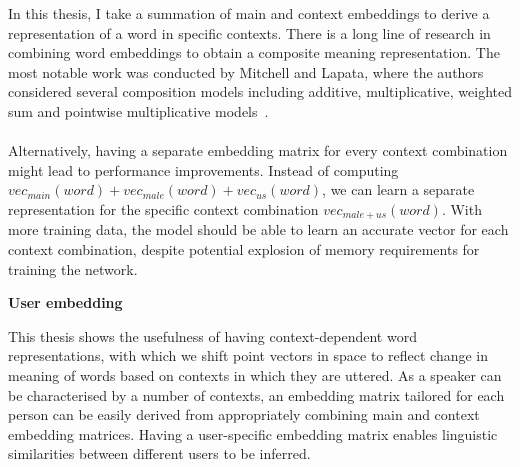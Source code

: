 \documentclass[a4paper,12pt,twoside,openright]{report}
\newcommand{\tb}{\vspace{10pt} \textbf}
\newcommand{\nl}{\\ \\}
\begin{document}
In this thesis, I take a summation of main and context embeddings to derive a representation of a word in specific contexts. There is a long line of research in combining word embeddings to obtain a composite meaning representation. The most notable work was conducted by Mitchell and Lapata, where the authors considered several composition models including additive, multiplicative, weighted sum and pointwise multiplicative models~\cite{mitchell10}.
\nl
Alternatively, having a separate embedding matrix for every context combination might lead to performance improvements. Instead of computing $vec_{main}(word)+vec_{male}(word)+vec_{us}(word)$, we can learn a separate representation for the specific context combination $vec_{male+us}(word)$. With more training data, the model should be able to learn an accurate vector for each context combination, despite potential explosion of memory requirements for training the network.

\tb{User embedding}

This thesis shows the usefulness of having context-dependent word representations, with which we shift point vectors in space to reflect change in meaning of words based on contexts in which they are uttered. As a speaker can be characterised by a number of contexts, an embedding matrix tailored for each person can be easily derived from appropriately combining main and context embedding matrices. Having a user-specific embedding matrix enables linguistic similarities between different users to be inferred.

\appendix
\singlespacing

 
 
\end{document}
